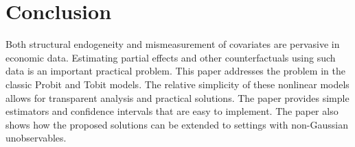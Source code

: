 \documentclass[12pt]{article}
\begin{document}
\bigskip

\section{Conclusion}

Both structural endogeneity and mismeasurement of covariates are pervasive
in economic data. Estimating partial effects and other counterfactuals using
such data is an important practical problem. This paper addresses the
problem in the classic Probit and Tobit models. The relative simplicity of
these nonlinear models allows for transparent analysis and practical
solutions. The paper provides simple estimators and confidence intervals
that are easy to implement. The paper also shows how the proposed solutions
can be extended to settings with non-Gaussian unobservables.

\bigskip




\bigskip
\end{document}
